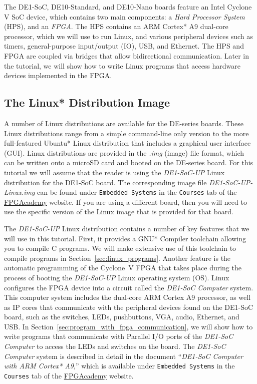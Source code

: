\documentclass[11pt, twoside, pdftex]{article}
\begin{document}
The DE1-SoC, DE10-Standard, and DE10-Nano boards feature an Intel Cyclone V 
SoC device, which contains two main components: 
a {\it Hard Processor System} (HPS), and an {\it FPGA}. 
The HPS contains an ARM Cortex* A9 dual-core processor, which we will use to run Linux, and 
various peripheral devices such as timers, 
general-purpose input/output (IO), USB, and Ethernet. The HPS and FPGA are coupled via 
bridges that allow bidirectional communication. Later in the tutorial, we will show how 
to write Linux programs that access hardware devices implemented in the FPGA.

\subsection{The Linux* Distribution Image}
\label{sec:image}

A number of Linux distributions are available for the DE-series boards. These Linux distributions 
range from a simple command-line only version to the more full-featured Ubuntu* Linux 
distribution that includes a graphical user interface (GUI). Linux distributions are provided 
in the \textit{.img} (image) file format, which can be written onto a microSD card and booted 
on the DE-series board. For this tutorial we will assume that the reader is using the 
\textit{DE1-SoC-UP} Linux distribution for the DE1-SoC board. The corresponding image 
file \textit{DE1-SoC-UP-Linux.img} can be found under \texttt{Embedded Systems} in 
the \texttt{Courses} tab of the
{\small \href{https://www.fpgacademy.org/courses.html/}
{FPGAcademy}} website.
If you are using a different board, then you will need to use the specific version of the 
Linux image that is provided for that board.

The \textit{DE1-SoC-UP} Linux distribution contains a number of key features that we will use 
in this tutorial. First, it provides a GNU* Compiler toolchain allowing you to compile C programs.
We will make extensive use of this toolchain to compile programs in 
Section~\ref{sec:linux_programs}. Another feature is the automatic programming of the Cyclone~V
FPGA that takes place during the process of booting the \textit{DE1-SoC-UP} Linux operating 
system (OS). Linux configures the FPGA device into a circuit called the 
\textit{DE1-SoC Computer} system.
This computer system includes the dual-core ARM Cortex A9 processor, as well as IP cores that 
communicate with the peripheral devices found on the DE1-SoC board, such as the switches, 
LEDs, pushbuttons, VGA, audio, Ethernet, and USB. In 
Section~\ref{sec:program_with_fpga_communication}, we will 
show how to write programs that communicate with Parallel I/O ports of the 
\textit{DE1-SoC Computer} to access the LEDs and switches on the board. 
The \textit{DE1-SoC Computer} system is described in detail in the document 
``\textit{DE1-SoC Computer with ARM Cortex* A9},'' which is available under 
\texttt{Embedded Systems} in the \texttt{Courses} tab of the 
{\small \href{https://www.fpgacademy.org/courses.html} {FPGAcademy}} website.
\end{document}
